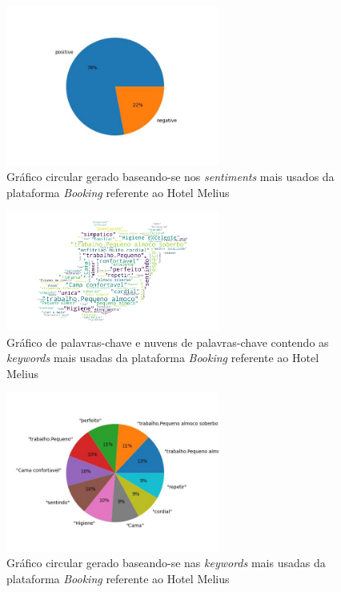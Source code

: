\begin{figure}[!htb]
\centering
\includegraphics[width=7cm]{figuras/Booking/hotel5_sentiments.jpeg}
\caption{Gráfico circular gerado baseando-se nos \textit{sentiments} mais usados da plataforma \textit{Booking} referente ao Hotel Melius}
\label{fig:exemplofig}
\end{figure}

\begin{figure}[!htb]
\centering
\includegraphics[width=7cm]{figuras/Booking/hotel5_keywordcloud.jpeg}
\caption{Gráfico de palavras-chave e nuvens de palavras-chave contendo as \textit{keywords} mais usadas da plataforma \textit{Booking} referente ao Hotel Melius}
\label{fig:exemplofig}
\end{figure}

\begin{figure}[!htb]
\centering
\includegraphics[width=7cm]{figuras/Booking/hotel5_keywords.jpeg}
\caption{Gráfico circular gerado baseando-se nas \textit{keywords} mais usadas da plataforma \textit{Booking} referente ao Hotel Melius}
\label{fig:exemplofig}
\end{figure}

